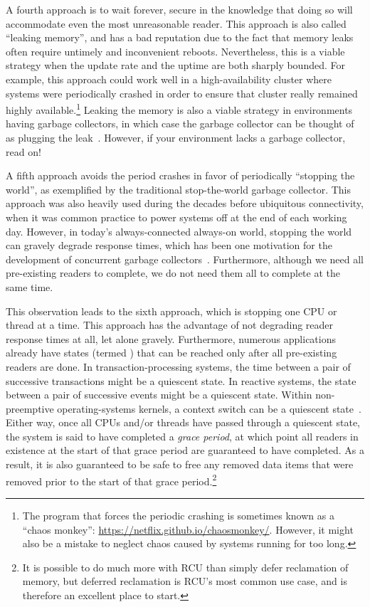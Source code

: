 A fourth approach is to wait forever, secure in the knowledge that
doing so will accommodate even the most unreasonable reader.
This approach is also called ``leaking memory'', and has a bad reputation
due to the fact that memory leaks often require untimely and
inconvenient reboots.
Nevertheless, this is a viable strategy when the update rate and the
uptime are both sharply bounded.
For example, this approach could work well in a high-availability
cluster where systems were periodically crashed in order to ensure
that cluster really remained highly available.\footnote{
	The program that forces the periodic crashing is sometimes
	known as a ``chaos monkey'':
	\url{https://netflix.github.io/chaosmonkey/}.
	However, it might also be a mistake to neglect chaos caused
	by systems running for too long.}
Leaking the memory is also a viable strategy in environments having
garbage collectors, in which case the garbage collector can be thought
of as plugging the leak~\cite{Kung80}.
However, if your environment lacks a garbage collector, read on!

A fifth approach avoids the period crashes in favor of periodically
``stopping the world'', as exemplified by the traditional stop-the-world
garbage collector.
This approach was also heavily used during the decades before
ubiquitous connectivity, when it was common practice to power systems
off at the end of each working day.
However, in today's always-connected always-on world, stopping the world
can gravely degrade response times, which has been one motivation for the
development of concurrent garbage collectors~\cite{DavidFBacon2003RTGC}.
Furthermore, although we need all pre-existing readers to complete, we do
not need them all to complete at the same time.

This observation leads to the sixth approach, which is stopping
one CPU or thread at a time.
This approach has the advantage of not degrading reader response times
at all, let alone gravely.
Furthermore, numerous applications already have states (termed
\emph{}) that can be
reached only after all pre-existing readers are done.
In transaction-processing systems, the time between a pair of
successive transactions might be a quiescent state.
In reactive systems, the state between a pair of successive events
might be a quiescent state.
Within non-preemptive operating-systems kernels, a context switch can be
a quiescent state~\cite{McKenney98}.
Either way, once all CPUs and/or threads have passed through a quiescent
state, the system is said to have completed a \emph{grace period},
at which point all readers in existence at the start of that grace period
are guaranteed to have completed.
As a result, it is also guaranteed to be safe to free any removed data
items that were removed prior to the start of that grace period.\footnote{
	It is possible to do much more with RCU than simply defer
	reclamation of memory, but deferred reclamation is RCU's most
	common use case, and is therefore an excellent place to start.}

